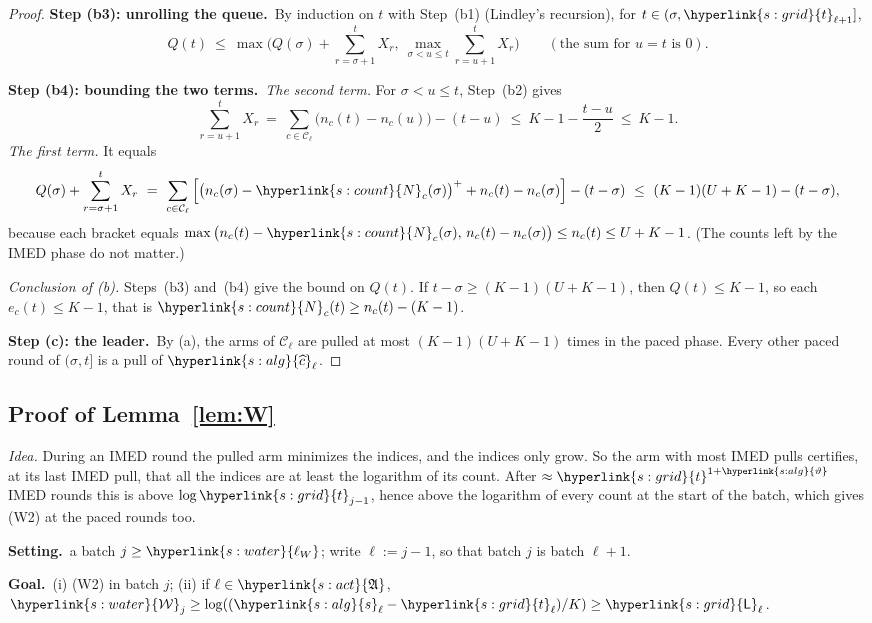\documentclass[10pt]{article}
\newcommand{\sy}[2]{{\hyperlink{#1}{#2}}}
\newcommand{\1}{\mathbf{1}}
\newcommand{\Ng}{\sy{s:count}{N}}
\newcommand{\tl}{\sy{s:grid}{t}}
\newcommand{\Lg}{\sy{s:grid}{\mathsf L}}
\newcommand{\sA}{\sy{s:alg}{s}}
\newcommand{\Ld}{\sy{s:alg}{\widehat c}}
\newcommand{\thv}{\sy{s:alg}{\vartheta}}
\newcommand{\Act}{\sy{s:act}{\mathfrak A}}
\newcommand{\Lam}{\sy{s:water}{\mathcal W}}
\newcommand{\lW}{\sy{s:water}{\ell_W}}
\newcommand{\Setting}{\noindent\textbf{Setting.}\ }
\newcommand{\Goal}{\par\smallskip\noindent\textbf{Goal.}\ }
\newcommand{\stp}[2]{\par\medskip\noindent\textbf{Step #1: #2.}\ }
\begin{document}
\begin{proof}
\stp{(b3)}{unrolling the queue}By induction on $t$ with Step~(b1) (Lindley's recursion), for $t\in(\sigma,\tl_{\ell+1}]$,
\[
Q(t)\ \le\ \max\Big(Q(\sigma)+\sum_{r=\sigma+1}^tX_r,\ \max_{\sigma<u\le t}\sum_{r=u+1}^tX_r\Big)\qquad(\text{the sum for }u=t\text{ is }0).
\]

\stp{(b4)}{bounding the two terms}\emph{The second term.} For $\sigma<u\le t$, Step~(b2) gives
\[
\sum_{r=u+1}^tX_r\ =\ \sum_{c\in\mathcal C_\ell}\big(n_c(t)-n_c(u)\big)-(t-u)\ \le\ K-1-\frac{t-u}2\ \le\ K-1 .
\]
\emph{The first term.} It equals
\[
Q(\sigma)+\sum_{r=\sigma+1}^tX_r\ =\ \sum_{c\in\mathcal C_\ell}\Big[\big(n_c(\sigma)-\Ng_c(\sigma)\big)^++n_c(t)-n_c(\sigma)\Big]-(t-\sigma)\ \le\ (K-1)(U+K-1)-(t-\sigma),
\]
because each bracket equals $\max\big(n_c(t)-\Ng_c(\sigma),\,n_c(t)-n_c(\sigma)\big)\le n_c(t)\le U+K-1$. (The counts left by the IMED phase do not matter.)

\noindent\emph{Conclusion of (b).} Steps~(b3) and~(b4) give the bound on $Q(t)$. If $t-\sigma\ge(K-1)(U+K-1)$, then $Q(t)\le K-1$, so each $e_c(t)\le K-1$, that is
$\Ng_c(t)\ge n_c(t)-(K-1)$.

\stp{(c)}{the leader}By (a), the arms of $\mathcal C_\ell$ are pulled at most $(K-1)(U+K-1)$ times in the paced phase. Every other paced round of $(\sigma,t]$ is a pull of
$\Ld_\ell$.
\end{proof}

\subsection{Proof of Lemma~\ref{lem:W}}\label{sec:pf-lem:W}
\noindent\emph{Idea.} During an IMED round the pulled arm minimizes the indices, and the indices only grow. So the arm with most IMED pulls certifies, at its last IMED
pull, that all the indices are at least the logarithm of its count. After $\approx\tl^{1+\thv}$ IMED rounds this is above $\log\tl_{j-1}$, hence above the logarithm of every
count at the start of the batch, which gives (W2) at the paced rounds too.

\begin{setgoal}
\Setting a batch $j\ge\lW$; write $\ell:=j-1$, so that batch $j$ is batch $\ell+1$.
\Goal (i) (W2) in batch $j$; (ii) if $\ell\in\Act$, $\Lam_j\ge\log((\sA_\ell-\tl_\ell)/K)\ge\Lg_\ell$.
\end{setgoal}
\end{document}
